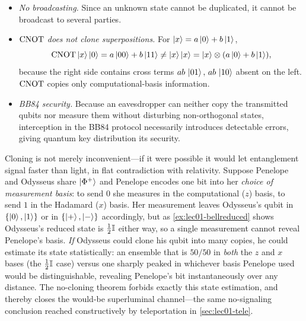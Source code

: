 \begin{remark}[Consequences]\leavevmode
\begin{itemize}[nosep]
  \item \emph{No broadcasting.} Since an unknown state cannot be duplicated, it cannot
        be broadcast to several parties.
  \item \emph{$\mathrm{CNOT}$ does not clone superpositions.} For $\ket{x}=a\ket{0}+b\ket{1}$,
        \[
          \mathrm{CNOT}\ket{x}\ket{0}=a\ket{00}+b\ket{11}\neq\ket{x}\ket{x}
          =\ket{x}\otimes(a\ket{0}+b\ket{1}),
        \]
        because the right side contains cross terms $ab\,\ket{01},\,ab\,\ket{10}$
        absent on the left. $\mathrm{CNOT}$ copies only computational-basis information.
  \item \emph{BB84 security.} Because an eavesdropper can neither copy the
        transmitted qubits nor measure them without disturbing non-orthogonal states,
        interception in the BB84 protocol necessarily introduces detectable errors,
        giving quantum key distribution its security.
\end{itemize}
\end{remark}

\begin{remark}\label{rem:lec01-clonesignal}
Cloning is not merely inconvenient---if it were possible it would let entanglement
signal faster than light, in flat contradiction with relativity. Suppose Penelope and Odysseus
share $\ket{\Phi^{+}}$ and Penelope encodes one bit into her \emph{choice of measurement
basis}: to send $0$ she measures in the computational ($z$) basis, to send $1$ in the
Hadamard ($x$) basis. Her measurement leaves Odysseus's qubit in $\{\ket{0},\ket{1}\}$ or in
$\{\ket{+},\ket{-}\}$ accordingly, but as \cref{ex:lec01-bellreduced} shows Odysseus's
reduced state is $\tfrac12\mathbb{I}$ either way, so a single measurement cannot reveal
Penelope's basis. \emph{If} Odysseus could clone his qubit into many copies, he could estimate
its state statistically: an ensemble that is $50/50$ in \emph{both} the $z$ and $x$
bases (the $\tfrac12\mathbb{I}$ case) versus one sharply peaked in whichever basis Penelope used
would be distinguishable, revealing Penelope's bit instantaneously over any distance. The
no-cloning theorem forbids exactly this state estimation, and thereby closes the
would-be superluminal channel---the same no-signaling conclusion reached constructively
by teleportation in \cref{sec:lec01-tele}.
\end{remark}

